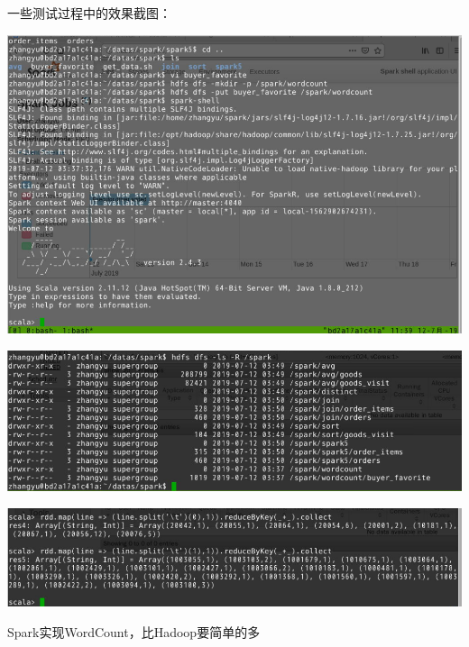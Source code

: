 \documentclass[UTF8]{report}
\begin{document}


一些测试过程中的效果截图：

\begin{center}
    \includegraphics[width=\linewidth]{spark/spark-shell2.png}    
\end{center}
    
\begin{center}
    \includegraphics[width=\linewidth]{spark/test_data.png}
\end{center}



\begin{center}
    \includegraphics[width=\linewidth]{spark/wordcount.png}

    Spark实现WordCount，比Hadoop要简单的多
\end{center}
    
\end{document}
